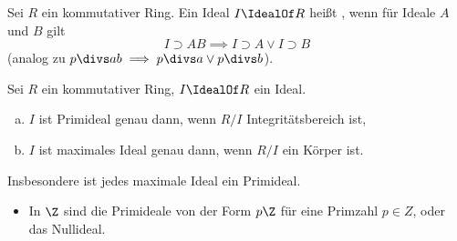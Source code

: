 \begin{df*}
	Sei $R$ ein kommutativer Ring.
	Ein Ideal $I \IdealOf R$ heißt , wenn für Ideale $A$ und $B$ gilt
	\[
		I \supset A B \implies I \supset A \lor I \supset B
	\]
	(analog zu $p \divs ab \implies p\divs a \lor p \divs b$).
\end{df*}

\begin{lem} \label{8.13}
	Sei $R$ ein kommutativer Ring, $I \IdealOf R$ ein Ideal.
	\begin{enumerate}[a)]
		\item
			$I$ ist Primideal genau dann, wenn $R / I$ Integritätsbereich ist,
		\item
			$I$ ist maximales Ideal genau dann, wenn $R / I$ ein Körper ist.
	\end{enumerate}
	Insbesondere ist jedes maximale Ideal ein Primideal.
\end{lem}

\begin{nt} \label{8.14}
	\begin{itemize}
		\item
			In $\Z$ sind die Primideale von der Form $p\Z$ für eine Primzahl $p \in Z$, oder das Nullideal.
	\end{itemize}
\end{nt}


